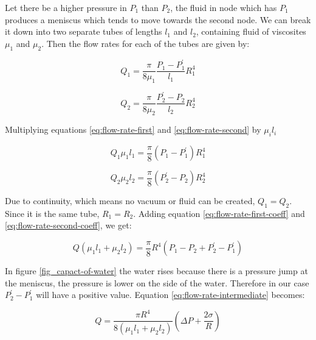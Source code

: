 	Let there be a higher pressure in $P_{1}$ than $P_{2}$, the fluid in node which has $P_{1}$ produces a meniscus which tends to move towards the second node. We can break it down into two separate tubes of lengths $l_{1}$ and $l_{2}$, containing fluid of viscosites ${\mu}_1$ and ${\mu}_2$. Then the flow rates for each of the tubes are given by:
	
	\begin{equation} \label{eq:flow-rate-first}
		Q_1 = \frac{\pi}{8{\mu}_1} \frac{P_1 - P^{'}_1}{l_1} R_1^4
	\end{equation}
	
	\begin{equation} \label{eq:flow-rate-second}
		Q_2 = \frac{\pi}{8{\mu}_2} \frac{P^{'}_2 - P_2}{l_2} R_2^4
	\end{equation}

	Multiplying equations \ref{eq:flow-rate-first} and \ref{eq:flow-rate-second} by ${\mu}_i l_i$
	
	\begin{equation} \label{eq:flow-rate-first-coeff}
		Q_1 {\mu}_1 l_1 = \frac{\pi}{8} (P_1 - P^{'}_1) R_1^4
	\end{equation}
	
	\begin{equation} \label{eq:flow-rate-second-coeff}
		Q_2 {\mu}_2 l_2 = \frac{\pi}{8} (P^{'}_2 - P_2) R_2^4
	\end{equation}

	Due to continuity, which means no vacuum or fluid can be created, $Q_1 = Q_2$. Since it is the same tube, $R_1 = R_2$. Adding equation \ref{eq:flow-rate-first-coeff} and \ref{eq:flow-rate-second-coeff}, we get:
	
	\begin{equation} \label{eq:flow-rate-intermediate}
		Q({\mu}_1 l_1 + {\mu}_2 l_2) = \frac{\pi}{8}R^4(P_1 - P_2 + P^{'}_2 - P^{'}_1)
	\end{equation}

	In figure \ref{fig_capact-of-water} the water rises because there is a pressure jump at the meniscus, the pressure is lower on the side of the water. Therefore in our case $P^{'}_2 - P^{'}_1$ will have a positive value. Equation \ref{eq:flow-rate-intermediate} becomes:
	
	\begin{equation} \label{eq:flow-rate-1mns-basic}
		Q = \frac{\pi R^4}{8({\mu}_1 l_1 + {\mu}_2 l_2)} \left( \Delta P + \frac{2\sigma}{R} \right)
	\end{equation}
	
